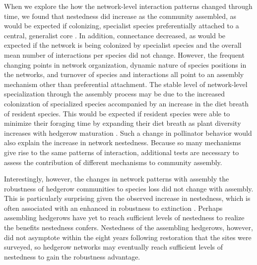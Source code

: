 \documentclass[12pt]{article}
\begin{document}
When we explore the how the network-level interaction patterns changed
through time, we found that nestedness did increase as the community
assembled, as would be expected if colonizing, specialist species
preferentially attached to a central, generalist core
\citep{albrecht2010plant}. In addition, connectance decreased, as
would be expected if the network is being colonized by specialist
species and the overall mean number of interactions per species did
not change. However, the frequent changing points in network
organization, dynamic nature of species positions in the networks, and
turnover of species and interactions all point to an assembly
mechanism other than preferential attachment.  The stable level of
network-level specialization through the assembly process may be due
to the increased colonization of specialized species
\citep{mgonigle-2015-x} accompanied by an increase in the diet breath
of resident species. This would be expected if resident species were
able to minimize their foraging time by expanding their diet breath as
plant diversity increases with hedgerow maturation \citep{Waser1996,
  pyke1984optimal, Bluthgen2007, albrecht2010plant}. Such a change in
pollinator behavior would also explain the increase in network
nestedness. Because so many mechanisms give rise to the same patterns
of interaction, additional tests are necessary to assess the
contribution of different mechanisms to community assembly.

Interestingly, however, the changes in network patterns with assembly
the robustness of hedgerow communities to species loss did not change
with assembly. This is particularly surprising given the observed
increase in nestedness, which is often associated with an enhanced in
robustness to extinction \citep{Memmott2004}. Perhaps assembling
hedgerows have yet to reach sufficient levels of nestedness to realize
the benefits nestedness confers. Nestedness of the assembling
hedgerows, however, did not asymptote within the eight years following
restoration that the sites were surveyed, so hedgerow networks may
eventually reach sufficient levels of nestedness to gain the
robustness advantage.
\end{document}
